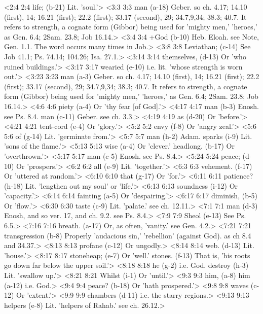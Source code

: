 <2:4 2:4  life; (b-21)  Lit. 'soul.'>
<3:3 3:3  man (a-18) Geber. so ch. 4.17; 14.10 (first), 14; 16.21 (first); 22.2  (first); 33.17 (second), 29; 34.7,9,34; 38.3; 40.7. It refers  to strength, a cognate form (Gibbor) being used for 'mighty  men,' 'heroes,' as Gen. 6.4; 2Sam. 23.8; Job 16.14.>
<3:4 3:4  +God (b-10)  Heb. Eloah. see Note, Gen. 1.1. The word occurs many times  in Job.>
<3:8 3:8  Leviathan; (c-14)  See Job 41.1; Ps. 74.14; 104.26; Isa. 27.1.>
<3:14 3:14  themselves, (d-13)  Or 'who ruined buildings.'>
<3:17 3:17  wearied (e-10)  i.e. lit. 'whose strength is worn out.'>
<3:23 3:23  man (a-3)  Geber. so ch. 4.17; 14.10 (first), 14; 16.21 (first); 22.2  (first); 33.17 (second), 29; 34.7,9,34; 38.3; 40.7. It refers  to strength, a cognate form (Gibbor) being used for 'mighty  men,' 'heroes,' as Gen. 6.4; 2Sam. 23.8; Job 16.14.>
<4:6 4:6  piety (a-4)  Or 'thy fear [of God].'>
<4:17 4:17  man (b-3)  Enosh. see Ps. 8.4.
  man (c-11)  Geber. see ch. 3.3.>
<4:19 4:19  as (d-20)  Or 'before.'>
<4:21 4:21  tent-cord (e-4)  Or 'glory.'>
<5:2 5:2  envy (f-8)  Or 'angry zeal.'>
<5:6 5:6  of (g-14)  Lit. 'germinate from.'>
<5:7 5:7  man (h-2)  Adam.
  sparks (i-9)  Lit. 'sons of the flame.'>
<5:13 5:13  wise (a-4)  Or 'clever.'
  headlong. (b-17)  Or 'overthrown.'>
<5:17 5:17  man (c-5)  Enosh. see Ps. 8.4.>
<5:24 5:24  peace; (d-10)  Or 'prospers.'>
<6:2 6:2  all (e-9)  Lit. 'together.'>
<6:3 6:3  vehement. (f-17)  Or 'uttered at random.'>
<6:10 6:10  that (g-17)  Or 'for.'>
<6:11 6:11  patience? (h-18)  Lit. 'lengthen out my soul' or 'life.'>
<6:13 6:13  soundness (i-12)  Or 'capacity.'>
<6:14 6:14  fainting (a-5)  Or 'despairing.'>
<6:17 6:17  diminish, (b-5)  Or 'flow.'>
<6:30 6:30  taste (c-9)  Lit. 'palate.' see ch. 12.11.>
<7:1 7:1  man (d-3)  Enosh, and so ver. 17, and ch. 9.2. see Ps. 8.4.>
<7:9 7:9  Sheol (e-13)  See Ps. 6.5.>
<7:16 7:16  breath. (a-17)  Or, as often, 'vanity.' see Gen. 4.2.>
<7:21 7:21  transgression (b-8)  Properly 'audacious sin,' 'rebellion' (against God). as ch  8.4 and 34.37.>
<8:13 8:13  profane (c-12)  Or ungodly.>
<8:14 8:14  web. (d-13)  Lit. 'house.'>
<8:17 8:17  stoneheap; (e-7)  Or 'well.'
  stones. (f-13)  That is, 'his roots go down far below the upper soil.'>
<8:18 8:18  he (g-2)  i.e. God.
  destroy (h-3)  Lit. 'swallow up.'>
<8:21 8:21  Whilst (i-1)  Or 'until.'>
<9:3 9:3  him, (a-8)  him (a-12)
 i.e. God.>
<9:4 9:4  peace? (b-18)  Or 'hath prospered.'>
<9:8 9:8  waves (c-12)  Or 'extent.'>
<9:9 9:9  chambers (d-11)  i.e. the starry regions.>
<9:13 9:13  helpers (e-8)  Lit. 'helpers of Rahab.' see ch. 26.12.>
